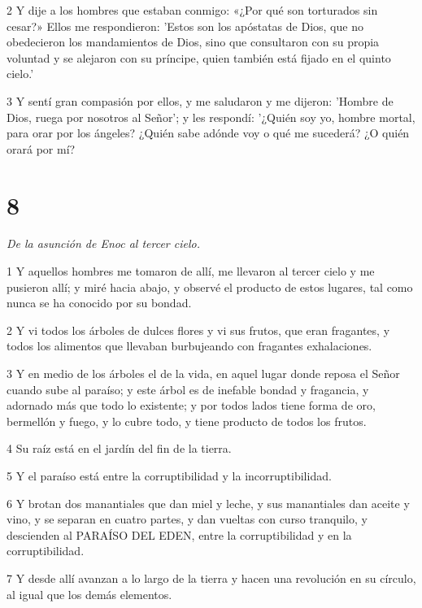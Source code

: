 \par 2 Y dije a los hombres que estaban conmigo: «¿Por qué son torturados sin cesar?» Ellos me respondieron: 'Estos son los apóstatas de Dios, que no obedecieron los mandamientos de Dios, sino que consultaron con su propia voluntad y se alejaron con su príncipe, quien también está fijado en el quinto cielo.'

\par 3 Y sentí gran compasión por ellos, y me saludaron y me dijeron: 'Hombre de Dios, ruega por nosotros al Señor'; y les respondí: '¿Quién soy yo, hombre mortal, para orar por los ángeles? ¿Quién sabe adónde voy o qué me sucederá? ¿O quién orará por mí?

\chapter{8}

\par \textit{De la asunción de Enoc al tercer cielo.}

\par 1 Y aquellos hombres me tomaron de allí, me llevaron al tercer cielo y me pusieron allí; y miré hacia abajo, y observé el producto de estos lugares, tal como nunca se ha conocido por su bondad.

\par 2 Y vi todos los árboles de dulces flores y vi sus frutos, que eran fragantes, y todos los alimentos que llevaban burbujeando con fragantes exhalaciones.

\par 3 Y en medio de los árboles el de la vida, en aquel lugar donde reposa el Señor cuando sube al paraíso; y este árbol es de inefable bondad y fragancia, y adornado más que todo lo existente; y por todos lados tiene forma de oro, bermellón y fuego, y lo cubre todo, y tiene producto de todos los frutos.

\par 4 Su raíz está en el jardín del fin de la tierra.

\par 5 Y el paraíso está entre la corruptibilidad y la incorruptibilidad.

\par 6 Y brotan dos manantiales que dan miel y leche, y sus manantiales dan aceite y vino, y se separan en cuatro partes, y dan vueltas con curso tranquilo, y descienden al PARAÍSO DEL EDEN, entre la corruptibilidad y en la corruptibilidad.

\par 7 Y desde allí avanzan a lo largo de la tierra y hacen una revolución en su círculo, al igual que los demás elementos.

